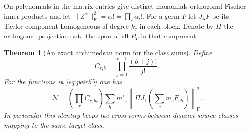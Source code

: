 \documentclass[a4paper,11pt]{article}
\newtheorem{theorem}[proposition]{Theorem}
\theoremstyle{definition}
\theoremstyle{remark}
\numberwithin{equation}{section}
\begin{document}
On polynomials in the matrix entries give distinct monomials
orthogonal Fischer inner products and let
\(\|Z^\alpha\|_{\mathrm F}^2=\alpha!=\prod_i\alpha_i!\).
For a germ \(F\) let \(J_{\boldsymbol k}F\) be its Taylor component
homogeneous of degree \(k_\tau\) in each block. Denote by \(\Pi\)
the orthogonal projection onto the span of all \(P_T\) in that
component.

\begin{theorem}[An exact archimedean norm for the class sums]\leavevmode\label{thm:frame55}
Define
\[
          C_{r,b}=\prod_{j=0}^{r-1}\frac{(b+j)!}{j!}.
\]
For the functions in \eqref{eq:pair55} one has
\begin{equation}
 \mathcal N=\left(\prod_{\tau}C_{r,b_\tau}\right)
       \sum_h m'_h
         \left\|\Pi J_{\boldsymbol k}\!\left(\sum_c m_c F_{ch}\right)
                                              \right\|_{\mathrm F}^2 .
                                                      \label{eq:fisch55}
\end{equation}
In particular this identity keeps the cross terms between distinct
source classes mapping to the same target class.
\end{theorem}
\end{document}
